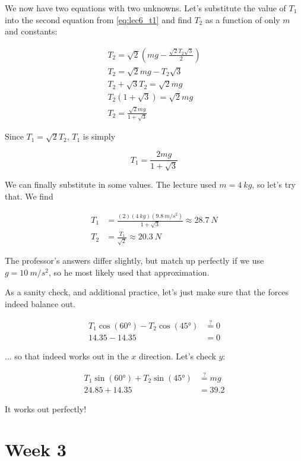 \documentclass[12pt,a4paper]{report}
\begin{document}
We now have two equations with two unknowns. Let's substitute the value of $T_1$ into the second equation from \eqref{eq:lec6_t1} and find $T_2$ as a function of only $m$ and constants:

\begin{align}
T_2 = \sqrt{2}\left(m g - \frac{\sqrt{2} T_2 \sqrt{3}}{2}\right)\\
T_2 = \sqrt{2} m g - T_2 \sqrt{3}\\
T_2 + \sqrt{3} T_2 = \sqrt{2} m g\\
T_2 (1 + \sqrt{3}) = \sqrt{2} m g\\
T_2 = \frac{\sqrt{2} m g}{1 + \sqrt{3}}
\end{align}

Since $T_1 = \sqrt{2} T_2$, $T_1$ is simply

\begin{equation}
T_1 = \frac{2 m g}{1 + \sqrt{3}}
\end{equation}

We can finally substitute in some values. The lecture used $m = \SI{4}{kg}$, so let's try that. We find

\begin{align}
T_1 &= \frac{(2)(\SI{4}{kg})(\SI{9.8}{m/s^2})}{1 + \sqrt{3}} \approx \SI{28.7}{N}\\
T_2 &= \frac{T_1}{\sqrt{2}} \approx \SI{20.3}{N}
\end{align}

The professor's answers differ slightly, but match up perfectly if we use $g = \SI{10}{m/s^2}$, so he most likely used that approximation.

As a sanity check, and additional practice, let's just make sure that the forces indeed balance out.

\begin{align}
T_1 \cos(\ang{60}) - T_2 \cos(\ang{45}) &\overset{?}{=} 0\\
14.35 - 14.35 &= 0
\end{align}

... so that indeed works out in the $x$ direction. Let's check $y$:

\begin{align}
T_1 \sin(\ang{60}) + T_2 \sin(\ang{45}) &\overset{?}{=} m g\\
24.85 + 14.35 &= 39.2
\end{align}

It works out perfectly!

\chapter{Week 3}
\end{document}
